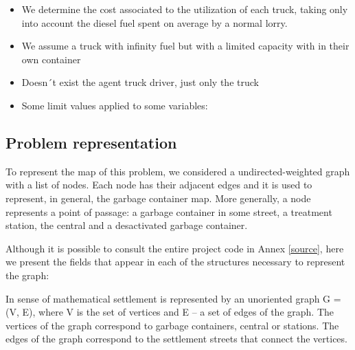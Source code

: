 \documentclass[a4paper]{article}
\begin{document}
\begin{itemize}
	\item We determine the cost associated to the utilization of each truck, taking only into account the diesel fuel spent on average by a normal lorry. 
	
	\item We assume a truck with infinity fuel but with a limited capacity with in their own container
	
	\item Doesn´t exist the agent truck driver, just only the truck
	
	\item Some limit values applied to some variables:
		
\end{itemize}

\subsection{Problem representation}

To represent the map of this problem, we considered a undirected-weighted graph with a list of nodes. Each node has their adjacent edges and it is used to represent, in general, the garbage container map. More generally, a node represents a point of passage: a garbage container in some street, a treatment station, the central and a desactivated garbage container. 

Although it is possible to consult the entire project code in Annex \ref{source}, here we present the fields that appear in each of the structures necessary to represent the graph:

In sense of mathematical settlement is represented by an unoriented graph G = (V, E), where V is the set of vertices and E – a set of edges of the graph. The vertices of the graph correspond to garbage containers, central or stations. The edges of the graph correspond to the settlement streets that connect the vertices.
\end{document}
